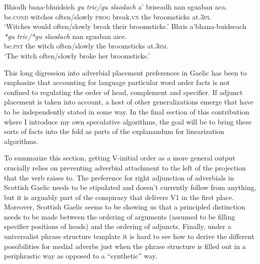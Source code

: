 \documentclass[output=paper,colorlinks,citecolor=brown]{langscibook}
\begin{document}
\newpage
\ea\label{ex:r33}
\gll Bhiodh bana-bhuidsich {\textit{gu tric/gu slaodach}} a'   briseadh nan sguaban aca.\\
be.\textsc{cond} witches often/slowly \textsc{prog}  break.\textsc{vn} the broomsticks at.\textsc{3pl}\\
\glt `Witches would often/slowly break their broomsticks.'
\ex\label{ex:r34}
\gll Bhris a'bhana-buidseach \textit{*gu tric/*gu slaodach} nan sguaban aice.\\
be.\textsc{pst} {the witch} often/slowly the broomsticks at.\textsc{3sm}.\\
\glt `The witch often/slowly broke her broomsticks.'
\z
{}

This long digression into adverbial placement preferences in  Gaelic has been to emphasize that accounting for language particular word order facts is not confined to regulating the order of head, complement and specifier. If adjunct placement is taken into account, a host of other generalizations emerge that have to be independently stated in some way. In the final section of this contribution where I introduce my own speculative algorithms, the goal will be to bring these sorts of facts into the fold as parts of the explanandum for linearization algorithms. 

To summarize this section, getting  V-initial order as a more general output crucially relies on preventing adverbial attachment to the left of the projection that the verb raises to. 
 The preference for right adjunction of adverbials in Scottish Gaelic needs to be stipulated and doesn't currently follow from anything, but it is arguably part of the conspiracy that delivers V1 in the first place.  Moreover, Scottish Gaelic seems to be showing us that a principled distinction needs to be made between the ordering of arguments (assumed to be filling specifier positions of heads) and the ordering of adjuncts. Finally,  under a universalist phrase structure template it is hard to see how to derive the different possibilities for medial adverbs just when the phrase structure is filled out in a periphrastic way as opposed to a “synthetic” way.
\end{document}
